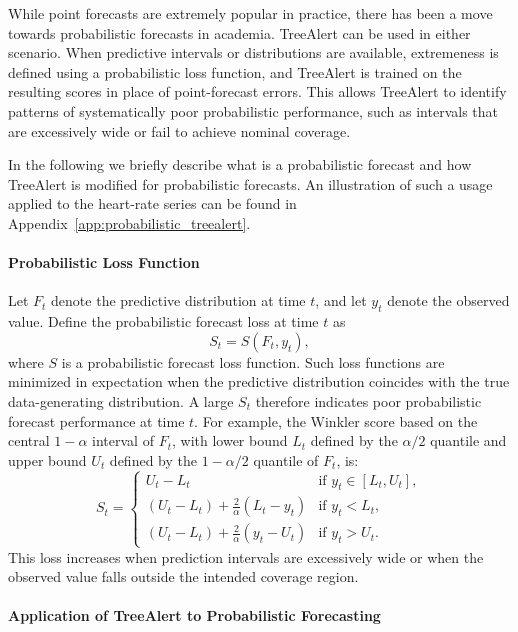 \documentclass[]{interact}
\theoremstyle{plain}
\theoremstyle{definition}
\theoremstyle{remark}
\begin{document}
While point forecasts are extremely popular in practice, there has been a move towards
probabilistic forecasts in academia. TreeAlert can be used in either scenario. When
predictive intervals or distributions are available, extremeness is defined using a
probabilistic loss function, and TreeAlert is trained on the resulting scores in place of
point-forecast errors. This allows TreeAlert to identify patterns of systematically poor
probabilistic performance, such as intervals that are excessively wide or fail to achieve
nominal coverage.

In the following we briefly describe what is a probabilistic forecast and how TreeAlert is
modified for probabilistic forecasts. An illustration of such a usage applied to the
heart-rate series can be found in Appendix~\ref{app:probabilistic_treealert}.

\paragraph{Probabilistic Loss Function}
Let $F_t$ denote the predictive distribution at time $t$, and let $y_t$ denote the observed
value. Define the probabilistic forecast loss at time $t$ as
\begin{equation}
S_t = S(F_t, y_t),
\end{equation}
where $S$ is a probabilistic forecast loss function. Such loss functions are minimized in
expectation when the predictive distribution coincides with the true data-generating
distribution. A large $S_t$ therefore indicates poor probabilistic forecast performance at
time $t$. For example, the Winkler score based on the central $1-\alpha$ interval of $F_t$,
with lower bound $L_t$ defined by the $\alpha/2$ quantile and upper bound $U_t$ defined by
the $1-\alpha/2$ quantile of $F_t$, is:
\begin{equation}
S_t =
\begin{cases}
U_t - L_t
& \text{if } y_t \in [L_t, U_t], \\[3pt]
(U_t - L_t) + \frac{2}{\alpha}(L_t - y_t)
& \text{if } y_t < L_t, \\[3pt]
(U_t - L_t) + \frac{2}{\alpha}(y_t - U_t)
& \text{if } y_t > U_t.
\end{cases}
\end{equation}
This loss increases when prediction intervals are excessively wide or when the observed value
falls outside the intended coverage region.

\paragraph{Application of TreeAlert to Probabilistic Forecasting}
\end{document}
